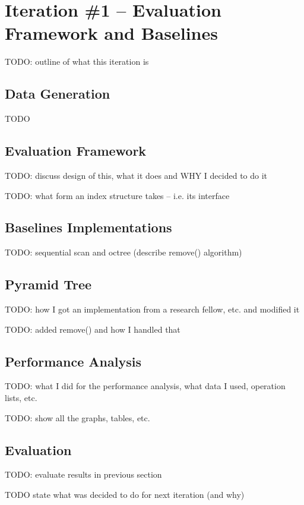 \section{Iteration \#1 -- Evaluation Framework and Baselines}

TODO: outline of what this iteration is

\subsection{Data Generation}

TODO

\subsection{Evaluation Framework}

TODO: discuss design of this, what it does and WHY I decided to do it

TODO: what form an index structure takes -- i.e. its interface

\subsection{Baselines Implementations}

TODO: sequential scan and octree (describe remove() algorithm)

\subsection{Pyramid Tree}

TODO: how I got an implementation from a research fellow, etc. and modified it

TODO: added remove() and how I handled that

\subsection{Performance Analysis}

TODO: what I did for the performance analysis, what data I used, operation lists, etc.

TODO: show all the graphs, tables, etc.

\subsection{Evaluation}

TODO: evaluate results in previous section

TODO state what was decided to do for next iteration (and why)